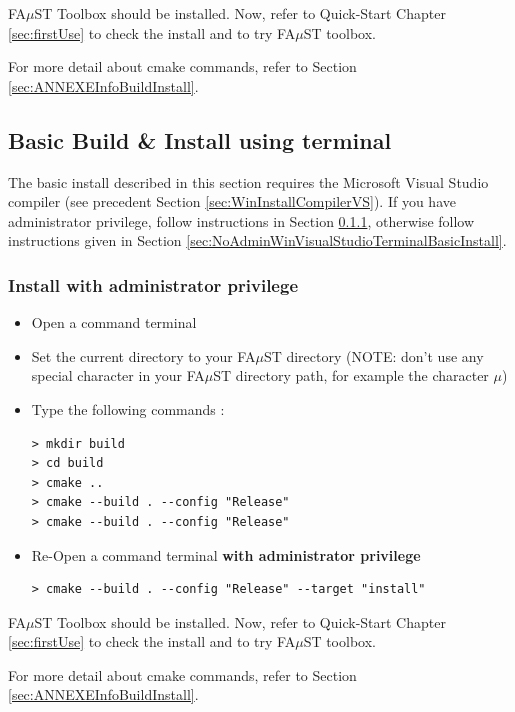 FA$\mu$ST Toolbox should be installed. Now, refer to Quick-Start Chapter \ref{sec:firstUse} to check the install and to try FA$\mu$ST toolbox.

For more detail about cmake commands, refer to Section \ref{sec:ANNEXEInfoBuildInstall}.

\subsection{Basic Build \& Install using terminal}\label{sec:WinVisualStudioTerminalBasicInstall}
The basic install described in this section requires the Microsoft Visual Studio compiler (see precedent Section \ref{sec:WinInstallCompilerVS}).
If you have administrator privilege, follow instructions in Section \ref{sec:AdminWinVisualStudioTerminalBasicInstall}, otherwise follow instructions given in Section \ref{sec:NoAdminWinVisualStudioTerminalBasicInstall}.

\subsubsection{Install with administrator privilege}
\label{sec:AdminWinVisualStudioTerminalBasicInstall}

\begin{itemize}
\item Open a command terminal
\item Set the current directory to your FA$\mu$ST directory (NOTE: don't use any special character in your FA$\mu$ST directory path, for example the character $\mu$)
\item Type the following commands : 

\begin{lstlisting}
> mkdir build
> cd build
> cmake ..
> cmake --build . --config "Release"
> cmake --build . --config "Release"
\end{lstlisting}
\item Re-Open a command terminal \textbf{with administrator privilege} 
\begin{lstlisting}
> cmake --build . --config "Release" --target "install"
\end{lstlisting}
\end{itemize}

FA$\mu$ST Toolbox should be installed. Now, refer to Quick-Start Chapter \ref{sec:firstUse} to check the install and to try FA$\mu$ST toolbox.

For more detail about cmake commands, refer to Section \ref{sec:ANNEXEInfoBuildInstall}.


